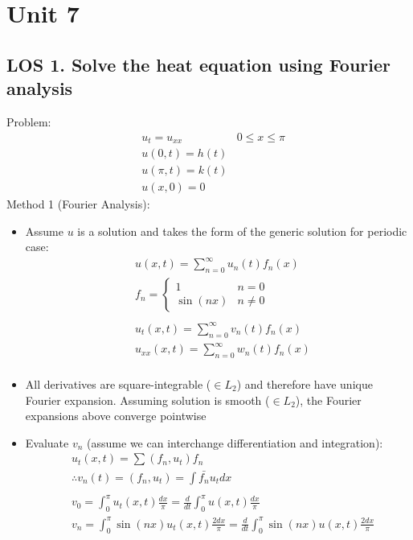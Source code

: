 \documentclass[12pt, a4paper]{article}
\begin{document}
\section*{Unit 7}
\vspace{1em}

\subsection*{LOS 1. Solve the heat equation using Fourier analysis}
Problem:
\begin{align*}
    &u_t = u_{xx} & 0\leq x\leq\pi\\
    &u(0,t) = h(t)\\
    &u(\pi, t) = k(t)\\
    &u(x, 0) = 0
\end{align*}
Method 1 (Fourier Analysis):
\begin{itemize}
    \item Assume $u$ is a solution and takes the form of the generic solution for periodic case:
    \begin{align*}
        &u(x, t) = \sum_{n=0}^{\infty}u_n(t)f_n(x)\\
        &f_n = \begin{cases}
            1 & n = 0\\
            \sin(nx) & n \ne 0
        \end{cases}\\\\
        &u_t(x, t) = \sum_{n=0}^{\infty}v_n(t)f_n(x)\\
        &u_{xx}(x, t) = \sum_{n=0}^{\infty}w_n(t)f_n(x)\\
    \end{align*}
    \item All derivatives are square-integrable ($\in L_2$) and therefore have unique Fourier expansion. Assuming solution is smooth ($\in L_2$), the Fourier expansions above converge pointwise
    \item Evaluate $v_n$ (assume we can interchange differentiation and integration):
    \begin{align*}
        &u_t(x, t) =\sum(f_n, u_t)f_n\\
        &\therefore v_n(t)=(f_n, u_t) = \int \bar{f_n}u_tdx\\\\
        &v_0 = \int_0^\pi u_t(x, t)\frac{dx}{\pi}= \frac{d}{dt}\int_0^\pi u(x, t)\frac{dx}{\pi}\\
        &v_n = \int_0^\pi \sin(nx)u_t(x, t)\frac{2dx}{\pi}= \frac{d}{dt}\int_0^\pi \sin(nx)u(x, t)\frac{2dx}{\pi}\\

\end{align*}
\end{itemize}
\end{document}
